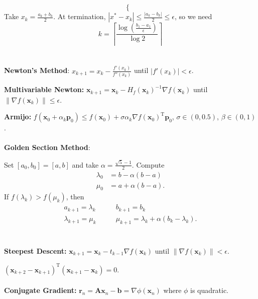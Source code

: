\documentclass[12pt]{article}
\newcommand{\norm}[1]{\left\lVert#1\right\rVert}
\begin{document}
\begin{multicols*}{3}
\begin{equation*}
\begin{cases}
            \end{cases}
        \end{equation*}
        Take $x_k = \frac{a_k + b_k}{2}$. At termination, $\left\lvert x^* - x_k \right\rvert \leq \frac{\left\lvert a_k - b_k \right\rvert}{2} \leq \epsilon$, so we need
        \begin{equation*}
            k = \left\lceil\frac{\log\left(\frac{b_1 - a_1}{\epsilon}\right)}{\log{2}}\right\rceil
        \end{equation*}
        \\\\
        \textbf{Newton's Method}: $x_{k + 1} = x_k - \frac{f'(x_k)}{f''(x_k)}$ until $\left\lvert f'(x_k)\right\rvert < \epsilon$.

        \textbf{Multivariable Newton:} $\bm{x}_{k + 1} = \bm{x}_k - H_f(\bm{x}_k)^{-1}\nabla f(\bm{x}_k)$ until $\norm{\nabla f(\bm{x}_k)} \leq \epsilon$.

        \textbf{Armijo:} $f(\bm{x}_0 + \alpha_k\bm{p}_0) \leq f(\bm{x}_0) + \sigma\alpha_k\nabla f(\bm{x}_0)^{\mathrm{T}}\bm{p}_0$, $\sigma \in (0, 0.5)$, $\beta \in (0, 1)$.
        \\\\
        \textbf{Golden Section Method}: 

        Set $[a_0, b_0] = [a, b]$ and take $\alpha = \frac{\sqrt{5} - 1}{2}$. Compute
        \begin{align*}
            \lambda_0 & = b - \alpha(b - a) \\
            \mu_0 & = a + \alpha(b - a).
        \end{align*}
        If $f(\lambda_k) > f(\mu_k)$, then
        \begin{align*}
            a_{k + 1} = \lambda_k &\qquad b_{k + 1} = b_k \\
            \lambda_{k + 1} = \mu_k &\qquad \mu_{k + 1} = \lambda_k + \alpha(b_k - \lambda_k).
        \end{align*}
        \\\\
        \textbf{Steepest Descent:} $\bm{x}_{k + 1} = \bm{x}_k - t_{k - 1}\nabla f(\bm{x}_k)$ until $\norm{\nabla f(\bm{x}_k)} < \epsilon$.

        $(\bm{x}_{k + 2} - \bm{x}_{k + 1})^{\mathrm{T}}(\bm{x}_{k + 1} - \bm{x}_k) = 0$.
        \\\\
        \textbf{Conjugate Gradient:} $\bm{r}_n = \bm{Ax}_n - \bm{b} = \nabla \phi(\bm{x}_n)$ where $\phi$ is quadratic.


\end{multicols*}
\end{document}
